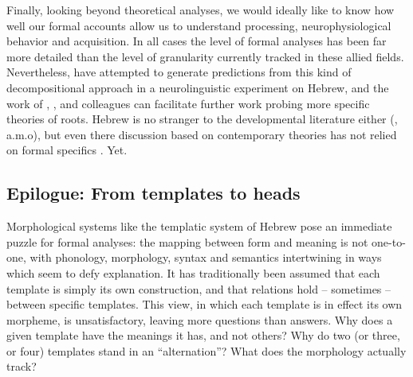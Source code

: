 \begin{exe}
\begin{xlist}
\begin{xlist}
\begin{xlist}
\begin{xlist}
\begin{xlist}
\begin{xlist}
\begin{exe}
\begin{xlist}
\begin{exe}
\begin{exe}
\begin{xlist}
\begin{exe}
\begin{exe}
\begin{xlist}
\begin{exe}
\begin{xlist}
\begin{exe}
\begin{xlist}
\begin{exe}
\begin{xlist}
\begin{exe}
\begin{xlist}
\begin{exe}
\begin{xlist}
\begin{exe}
\begin{xlist}
\begin{exe}
\begin{xlist}
\begin{exe}
\begin{xlist}
\begin{exe}
\begin{xlist}
\begin{exe}
\begin{xlist}
Finally, looking beyond theoretical analyses, we would ideally like to know how well our formal accounts allow us to understand processing, neurophysiological behavior and acquisition. In all cases the level of formal analyses has been far more detailed than the level of granularity currently tracked in these allied fields. Nevertheless, \cite{kastneretal18} have attempted to generate predictions from this kind of decompositional approach in a neurolinguistic experiment on Hebrew, and the work of \cite{frostetal97}, \cite{fmdpmetal05jml}, \cite{deutschkuperman18} and colleagues can facilitate further work probing more specific theories of roots. Hebrew is no stranger to the developmental literature either (\citealt{berman82,berman93jcl,ashkenazietal16,ravidetaltilar,havronarnon17jcl}, a.m.o), but even there discussion based on contemporary theories has not relied on formal specifics \citep{borer04,kastneradriaans17}. Yet.

	\subsection{Epilogue: From templates to heads}
Morphological systems like the templatic system of Hebrew pose an immediate puzzle for formal analyses: the mapping between form and meaning is not one-to-one, with phonology, morphology, syntax and semantics intertwining in ways which seem to defy explanation. It has traditionally been assumed that each template is simply its own construction, and that relations hold -- sometimes -- between specific templates. This view, in which each template is in effect its own morpheme, is unsatisfactory, leaving more questions than answers. Why does a given template have the meanings it has, and not others? Why do two (or three, or four) templates stand in an ``alternation''? What does the morphology actually track?


\end{xlist}
\end{exe}
\end{xlist}
\end{exe}
\end{xlist}
\end{exe}
\end{xlist}
\end{exe}
\end{xlist}
\end{exe}
\end{xlist}
\end{exe}
\end{xlist}
\end{exe}
\end{xlist}
\end{exe}
\end{xlist}
\end{exe}
\end{xlist}
\end{exe}
\end{xlist}
\end{exe}
\end{exe}
\end{xlist}
\end{exe}
\end{exe}
\end{xlist}
\end{exe}
\end{xlist}
\end{xlist}
\end{xlist}
\end{xlist}
\end{xlist}
\end{xlist}
\end{exe}

